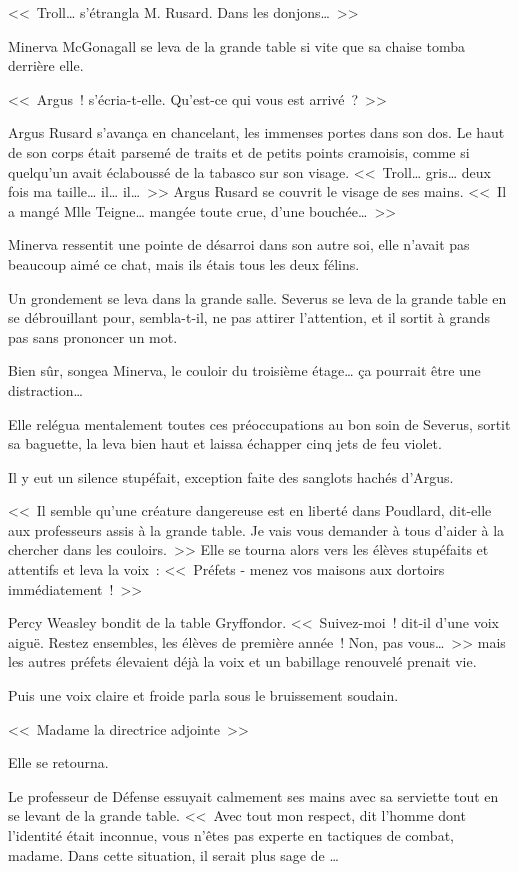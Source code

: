 <<~Troll… s'étrangla M. Rusard. Dans les donjons…~>>

Minerva McGonagall se leva de la grande table si vite que sa chaise tomba derrière elle.

<<~Argus~! s'écria-t-elle. Qu'est-ce qui vous est arrivé~?~>>

Argus Rusard s'avança en chancelant, les immenses portes dans son dos. Le haut de son corps était parsemé de traits et de petits points cramoisis, comme si quelqu'un avait éclaboussé de la tabasco sur son visage. <<~Troll… gris… deux fois ma taille… il… il…~>> Argus Rusard se couvrit le visage de ses mains. <<~Il a mangé Mlle Teigne… mangée toute crue, d'une bouchée…~>>

Minerva ressentit une pointe de désarroi dans son autre soi, elle n'avait pas beaucoup aimé ce chat, mais ils étais tous les deux félins.

Un grondement se leva dans la grande salle. Severus se leva de la grande table en se débrouillant pour, sembla-t-il, ne pas attirer l'attention, et il sortit à grands pas sans prononcer un mot.

Bien sûr, songea Minerva, le couloir du troisième étage… ça pourrait être une distraction…

Elle relégua mentalement toutes ces préoccupations au bon soin de Severus, sortit sa baguette, la leva bien haut et laissa échapper cinq jets de feu violet.

Il y eut un silence stupéfait, exception faite des sanglots hachés d'Argus.

<<~Il semble qu'une créature dangereuse est en liberté dans Poudlard, dit-elle aux professeurs assis à la grande table. Je vais vous demander à tous d'aider à la chercher dans les couloirs.~>> Elle se tourna alors vers les élèves stupéfaits et attentifs et leva la voix~: <<~Préfets - menez vos maisons aux dortoirs immédiatement~!~>>

Percy Weasley bondit de la table Gryffondor. <<~Suivez-moi~! dit-il d'une voix aiguë. Restez ensembles, les élèves de première année~! Non, pas vous…~>> mais les autres préfets élevaient déjà la voix et un babillage renouvelé prenait vie.

Puis une voix claire et froide parla sous le bruissement soudain.

<<~Madame la directrice adjointe~>>

Elle se retourna.

Le professeur de Défense essuyait calmement ses mains avec sa serviette tout en se levant de la grande table. <<~Avec tout mon respect, dit l'homme dont l'identité était inconnue, vous n'êtes pas experte en tactiques de combat, madame. Dans cette situation, il serait plus sage de …

